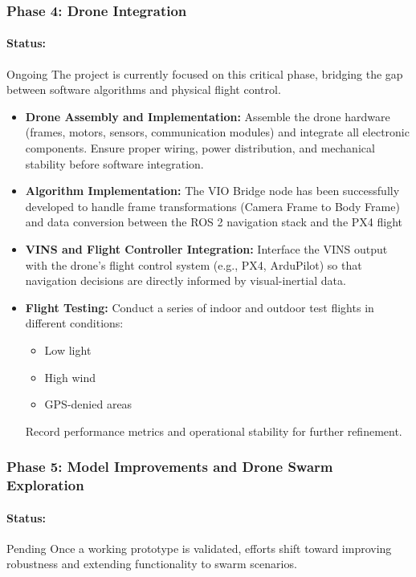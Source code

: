 \subsubsection{Phase 4: Drone Integration}
\paragraph{Status:}Ongoing
The project is currently focused on this critical phase, bridging the gap between software algorithms and physical flight control.

\begin{itemize}
\item \textbf{Drone Assembly and Implementation:} Assemble the drone hardware (frames, motors, sensors, communication modules) and integrate all electronic components. Ensure proper wiring, power distribution, and mechanical stability before software integration.
\item \textbf{Algorithm Implementation:} The VIO Bridge node has been successfully developed to handle frame transformations (Camera Frame to Body Frame) and data conversion between the ROS 2 navigation stack and the PX4 flight
\item \textbf{VINS and Flight Controller Integration:} Interface the VINS output with the drone’s flight control system (e.g., PX4, ArduPilot) so that navigation decisions are directly informed by visual-inertial data.
\item \textbf{Flight Testing:} Conduct a series of indoor and outdoor test flights in different conditions: 
    \begin{itemize}
        \item Low light
        \item High wind
        \item GPS-denied areas
    \end{itemize}
    Record performance metrics and operational stability for further refinement.
\end{itemize}

\subsubsection{Phase 5: Model Improvements and Drone Swarm Exploration}
\paragraph{Status:}Pending
Once a working prototype is validated, efforts shift toward improving robustness and extending functionality to swarm scenarios.

